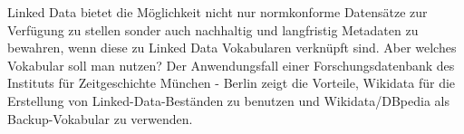 Linked Data bietet die Möglichkeit nicht nur normkonforme Datensätze zur
Verfügung zu stellen sonder auch nachhaltig und langfristig Metadaten zu
bewahren, wenn diese zu Linked Data Vokabularen verknüpft sind. Aber
welches Vokabular soll man nutzen? Der Anwendungsfall einer
Forschungsdatenbank des Instituts für Zeitgeschichte München - Berlin
zeigt die Vorteile, Wikidata für die Erstellung von
Linked-Data-Beständen zu benutzen und Wikidata/DBpedia als
Backup-Vokabular zu verwenden.
